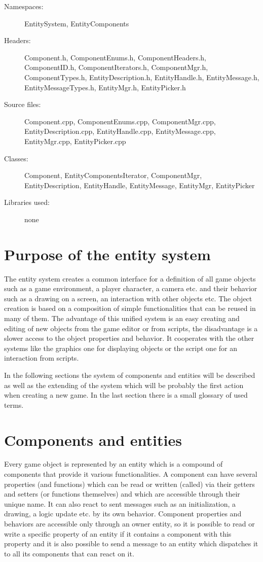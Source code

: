 \begin{description}
  \item[Namespaces:] EntitySystem, EntityComponents
  \item[Headers:] Component.h, ComponentEnums.h, ComponentHeaders.h, ComponentID.h, ComponentIterators.h, ComponentMgr.h, Com\-po\-nent\-Ty\-pes\-.h, EntityDescription.h, EntityHandle.h, EntityMessage.h, Entity\-Message\-Types.h, EntityMgr.h, EntityPicker.h
  \item[Source files:] Component.cpp, ComponentEnums.cpp, ComponentMgr.cpp, EntityDescription.cpp, EntityHandle.cpp, EntityMessage.cpp, Entity\-Mgr.cpp, EntityPicker.cpp
  \item[Classes:] Component, EntityComponentsIterator, ComponentMgr, EntityDescription, EntityHandle, EntityMessage, EntityMgr, EntityPicker
  \item[Libraries used:] none
\end{description}

\section{Purpose of the entity system}

The entity system creates a common interface for a definition of all game objects such as a game environment, a player character, a camera etc. and their behavior such as a drawing on a screen, an interaction with other objects etc. The object creation is based on a composition of simple functionalities that can be reused in many of them. The advantage of this unified system is an easy creating and editing of new objects from the game editor or from scripts, the disadvantage is a slower access to the object properties and behavior. It cooperates with the other systems like the graphics one for displaying objects or the script one for an interaction from scripts.

In the following sections the system of components and entities will be described as well as the extending of the system which will be probably the first action when creating a new game. In the last section there is a small glossary of used terms.

\section{Components and entities}

Every game object is represented by an entity which is a compound of components that provide it various functionalities. A component can have several properties (and functions) which can be read or written (called) via their getters and setters (or functions themselves) and which are accessible through their unique name. It can also react to sent messages such as an initialization, a drawing, a logic update etc. by its own behavior. Component properties and behaviors are accessible only through an owner entity, so it is possible to read or write a specific property of an entity if it contains a component with this property and it is also possible to send a message to an entity which dispatches it to all its components that can react on it.

